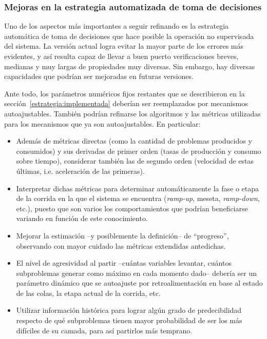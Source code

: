 \subsubsection{Mejoras en la estrategia automatizada de toma de decisiones}

Uno de los aspectos más importantes a seguir refinando es la estrategia
automática de toma de decisiones que hace posible la operación no supervisada
del sistema. La versión actual logra evitar la mayor parte de los errores más
evidentes, y así resulta capaz de llevar a buen puerto verificaciones breves,
medianas y muy largas de propiedades muy diversas. Sin embargo, hay diversas
capacidades que podrían ser mejoradas en futuras versiones.

Ante todo, los parámetros numéricos fijos restantes que se describieron en la
sección~\ref{estrategia:implementada} deberían ser reemplazados por mecanismos
autoajustables. También podrían refinarse los algoritmos y las métricas
utilizadas para los mecanismos que ya son autoajustables. En particular:

\begin{itemize}
	\item Además de métricas directas (como la cantidad de problemas producidos y consumidos) y sus derivadas de primer orden (tasas de producción y consumo sobre tiempo), considerar también las de segundo orden (velocidad de estas últimas, i.e. aceleración de las primeras).
	\item Interpretar dichas métricas para determinar automáticamente la fase o etapa de la corrida en la que el sistema se encuentra (\emph{ramp-up}, meseta, \emph{ramp-down}, etc.), puesto que son varios los comportamientos que podrían beneficiarse variando en función de este conocimiento.
	\item Mejorar la estimación --y posiblemente la definición-- de ``progreso'', observando con mayor cuidado las métricas extendidas antedichas.
	\item El nivel de agresividad al partir --cuántas variables levantar, cuántos subproblemas generar como máximo en cada momento dado-- debería ser un parámetro dinámico que se autoajuste por retroalimentación en base al estado de las colas, la etapa actual de la corrida, etc.
	\item Utilizar información histórica para lograr algún grado de predecibilidad respecto de qué subproblemas tienen mayor probabilidad de ser los más difíciles de su camada, para así partirlos más temprano.
	\end{itemize}


